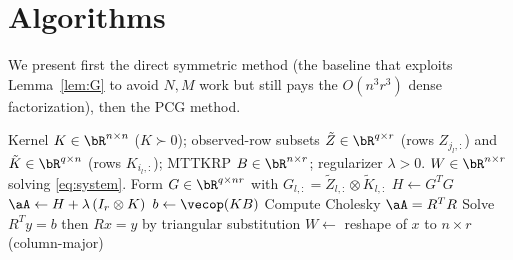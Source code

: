 \documentclass[12pt]{article}
\theoremstyle{definition}
\begin{document}
\section{Algorithms}

We present first the direct symmetric method (the baseline that exploits
Lemma~\ref{lem:G} to avoid $N,M$ work but still pays the $O(n^3r^3)$ dense
factorization), then the PCG method.

\begin{algorithm}[h]
\caption{Direct symmetric solve for the mode-$k$ RKHS subproblem}
\label{alg:direct}
\begin{algorithmic}[1]
\Require Kernel $K\in\bR^{n\times n}$ ($K\succ0$); observed-row subsets
$\tilde Z\in\bR^{q\times r}$ (rows $Z_{j_l,:}$) and $\tilde K\in\bR^{q\times n}$
(rows $K_{i_l,:}$); MTTKRP $B\in\bR^{n\times r}$; regularizer $\lambda>0$.
\Ensure $W\in\bR^{n\times r}$ solving \eqref{eq:system}.
\State Form $G\in\bR^{q\times nr}$ with $G_{l,:}=\tilde Z_{l,:}\otimes\tilde K_{l,:}$
\State $H\gets G^{T}G$ 
\State $\aA\gets H+\lambda\,(I_r\otimes K)$ 
\State $b\gets \vecop(KB)$ 
\State Compute Cholesky $\aA=R^{T}R$ 
\State Solve $R^{T}y=b$ then $Rx=y$ by triangular substitution 
\State \Return $W\gets$ reshape of $x$ to $n\times r$ (column-major)
\end{algorithmic}
\end{algorithm}
\end{document}
